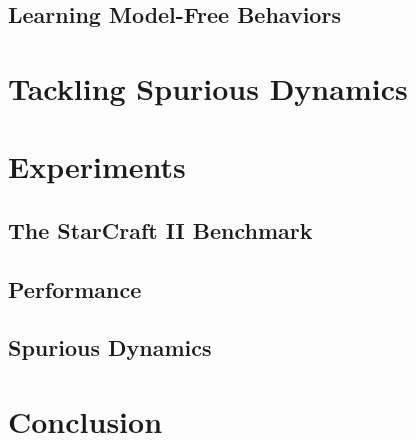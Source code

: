 \documentclass{article}
\begin{document}
\begin{multicols}{2}
\subsection{Learning Model-Free Behaviors}

\section{Tackling Spurious Dynamics}




\section{Experiments}

\subsection{The StarCraft II Benchmark}

\subsection{Performance}

\subsection{Spurious Dynamics}


\section{Conclusion}


 
\small{}
\end{multicols}

\end{document}
